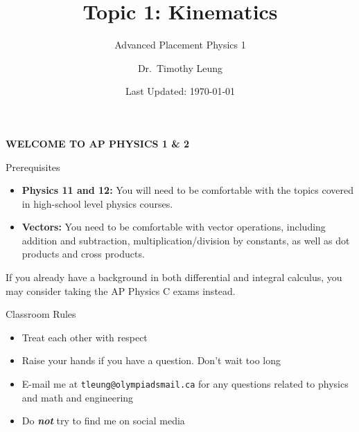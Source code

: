 \documentclass[12pt,compress,aspectratio=169]{beamer}
\title{Topic 1: Kinematics}
\subtitle{Advanced Placement Physics 1}
\author[TML]{Dr.\ Timothy Leung}
\institute{Olympiads School}
\date{Last Updated: \today}
\begin{document}
\begin{frame}{}

  {\LARGE
    \begin{center}
      \textbf{WELCOME TO AP PHYSICS 1 \& 2}
    \end{center}
  }
\end{frame}



\begin{frame}{Prerequisites}
  \begin{itemize}
  \item\textbf{Physics 11 and 12:} You will need to be comfortable with the
    topics covered in high-school level physics courses.
  \item\textbf{Vectors:} You need to be comfortable with vector operations,
    including addition and subtraction, multiplication/division by constants,
    as well as dot products and cross products.
  \end{itemize}
  If you already have a background in both differential and integral calculus,
  you may consider taking the AP Physics C exams instead.
\end{frame}






\begin{frame}{Classroom Rules}
  \begin{itemize}
  \item Treat each other with respect
  \item Raise your hands if you have a question. Don't wait too long
  \item E-mail me at \texttt{tleung@olympiadsmail.ca} for any questions related
    to physics and math and engineering
  \item Do \textbf{\emph{not}} try to find me on social media
  \end{itemize}
\end{frame}
\end{document}
